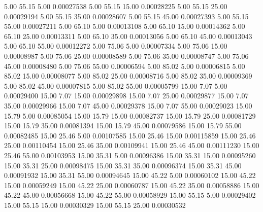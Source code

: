       5.00     55.15      5.00     0.00027538
      5.00     55.15     15.00     0.00028225
      5.00     55.15     25.00     0.00029194
      5.00     55.15     35.00     0.00028607
      5.00     55.15     45.00     0.00027393
      5.00     55.15     55.00     0.00027211
      5.00     65.10      5.00     0.00013108
      5.00     65.10     15.00     0.00014362
      5.00     65.10     25.00     0.00013311
      5.00     65.10     35.00     0.00013056
      5.00     65.10     45.00     0.00013043
      5.00     65.10     55.00     0.00012272
      5.00     75.06      5.00     0.00007334
      5.00     75.06     15.00     0.00008987
      5.00     75.06     25.00     0.00008589
      5.00     75.06     35.00     0.00008747
      5.00     75.06     45.00     0.00008480
      5.00     75.06     55.00     0.00006594
      5.00     85.02      5.00     0.00006815
      5.00     85.02     15.00     0.00008077
      5.00     85.02     25.00     0.00008716
      5.00     85.02     35.00     0.00009369
      5.00     85.02     45.00     0.00007815
      5.00     85.02     55.00     0.00005799
     15.00      7.07      5.00     0.00029400
     15.00      7.07     15.00     0.00029898
     15.00      7.07     25.00     0.00029877
     15.00      7.07     35.00     0.00029966
     15.00      7.07     45.00     0.00029378
     15.00      7.07     55.00     0.00029023
     15.00     15.79      5.00     0.00085054
     15.00     15.79     15.00     0.00082737
     15.00     15.79     25.00     0.00081729
     15.00     15.79     35.00     0.00081394
     15.00     15.79     45.00     0.00079586
     15.00     15.79     55.00     0.00082485
     15.00     25.46      5.00     0.00107585
     15.00     25.46     15.00     0.00115859
     15.00     25.46     25.00     0.00110454
     15.00     25.46     35.00     0.00109941
     15.00     25.46     45.00     0.00111230
     15.00     25.46     55.00     0.00103953
     15.00     35.31      5.00     0.00096386
     15.00     35.31     15.00     0.00095260
     15.00     35.31     25.00     0.00098475
     15.00     35.31     35.00     0.00096374
     15.00     35.31     45.00     0.00091932
     15.00     35.31     55.00     0.00094645
     15.00     45.22      5.00     0.00060102
     15.00     45.22     15.00     0.00059249
     15.00     45.22     25.00     0.00060787
     15.00     45.22     35.00     0.00058886
     15.00     45.22     45.00     0.00056668
     15.00     45.22     55.00     0.00058929
     15.00     55.15      5.00     0.00029402
     15.00     55.15     15.00     0.00030329
     15.00     55.15     25.00     0.00030532
